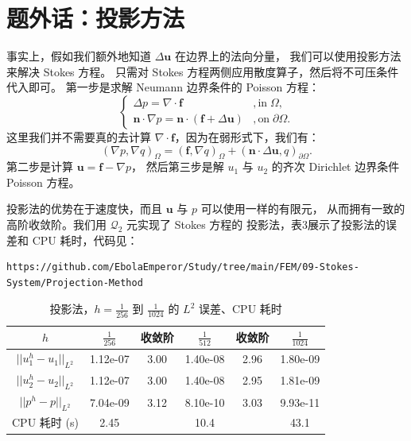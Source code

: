 \documentclass[lang=cn,11pt,a4paper]{elegantpaper}
\begin{document}
\vspace{-0.5em}
\section{题外话：投影方法}
\vspace{-0.5em}

事实上，假如我们额外地知道 $\Delta \mathbf{u}$ 在边界上的法向分量，
我们可以使用投影方法来解决 Stokes 方程。
只需对 Stokes 方程两侧应用散度算子，然后将不可压条件代入即可。
第一步是求解 Neumann 边界条件的 Poisson 方程：
\begin{equation}
    \left\{
        \begin{array}{ll}
            \Delta p = \nabla \cdot \mathbf{f}& ,\text{in}\;\Omega,\\
            \mathbf{n}\cdot\nabla p = \mathbf{n}\cdot(\mathbf{f}+\Delta\mathbf{u}) & ,\text{on}\;\partial \Omega.
        \end{array}
    \right.
\end{equation}
这里我们并不需要真的去计算 $\nabla \cdot \mathbf{f}$，因为在弱形式下，我们有：
\begin{equation}
    (\nabla p,\nabla q)_\Omega=(\mathbf{f},\nabla q)_\Omega+(\mathbf{n}\cdot\Delta\mathbf{u},q)_{\partial \Omega}.
\end{equation}
第二步是计算 $\mathbf{u}=\mathbf{f}-\nabla p$，
然后第三步是解 $u_1$ 与 $u_2$ 的齐次 Dirichlet 边界条件 Poisson 方程。

投影法的优势在于速度快，而且 $\mathbf{u}$ 与 $p$ 可以使用一样的有限元，
从而拥有一致的高阶收敛阶。我们用 $\mathcal{Q}_2$ 元实现了 Stokes 方程的
投影法，表3展示了投影法的误差和 CPU 耗时，代码见：
\begin{lstlisting}
https://github.com/EbolaEmperor/Study/tree/main/FEM/09-Stokes-System/Projection-Method
\end{lstlisting}

\begin{table}[H]
    \centering
    \begin{tabular}{cccccc}
    \hline
         $h$               & $\frac{1}{256}$ & 收敛阶  & $\frac{1}{512}$ & 收敛阶  & $\frac{1}{1024}$ \\ \hline
         $||u_1^h-u_1||_{L^2}$ & 1.12e-07        & 3.00 & 1.40e-08        & 2.96 & 1.80e-09         \\
         $||u_2^h-u_2||_{L^2}$ & 1.12e-07        & 3.00 & 1.40e-08        & 2.95 & 1.81e-09         \\
         $||p^h-p||_{L^2}$     & 7.04e-09        & 3.12 & 8.10e-10        & 3.03 & 9.93e-11         \\
         CPU 耗时 (s)          & 2.45        &    & 10.4        &  & 43.1         \\ \hline
    \end{tabular}
    \caption{\small 投影法，$h=\frac{1}{256}$ 到 $\frac{1}{1024}$ 的 $L^2$ 误差、CPU 耗时}
\end{table}

\appendix
\addappheadtotoc
\end{document}
